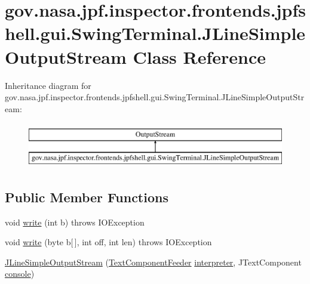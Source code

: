 \hypertarget{classgov_1_1nasa_1_1jpf_1_1inspector_1_1frontends_1_1jpfshell_1_1gui_1_1_swing_terminal_1_1_j_line_simple_output_stream}{}\section{gov.\+nasa.\+jpf.\+inspector.\+frontends.\+jpfshell.\+gui.\+Swing\+Terminal.\+J\+Line\+Simple\+Output\+Stream Class Reference}
\label{classgov_1_1nasa_1_1jpf_1_1inspector_1_1frontends_1_1jpfshell_1_1gui_1_1_swing_terminal_1_1_j_line_simple_output_stream}
Inheritance diagram for gov.\+nasa.\+jpf.\+inspector.\+frontends.\+jpfshell.\+gui.\+Swing\+Terminal.\+J\+Line\+Simple\+Output\+Stream\+:\begin{figure}[H]
\begin{center}
\leavevmode
\includegraphics[height=2.000000cm]{classgov_1_1nasa_1_1jpf_1_1inspector_1_1frontends_1_1jpfshell_1_1gui_1_1_swing_terminal_1_1_j_line_simple_output_stream}
\end{center}
\end{figure}
\subsection*{Public Member Functions}
\begin{DoxyCompactItemize}
\item 
void \hyperlink{classgov_1_1nasa_1_1jpf_1_1inspector_1_1frontends_1_1jpfshell_1_1gui_1_1_swing_terminal_1_1_j_line_simple_output_stream_a9fd173ef490f783345bc182d63f14b71}{write} (int b)  throws I\+O\+Exception 
\item 
void \hyperlink{classgov_1_1nasa_1_1jpf_1_1inspector_1_1frontends_1_1jpfshell_1_1gui_1_1_swing_terminal_1_1_j_line_simple_output_stream_a3dab08ff519f981297b4e585ad743093}{write} (byte b\mbox{[}$\,$\mbox{]}, int off, int len)  throws I\+O\+Exception 
\item 
\hyperlink{classgov_1_1nasa_1_1jpf_1_1inspector_1_1frontends_1_1jpfshell_1_1gui_1_1_swing_terminal_1_1_j_line_simple_output_stream_ab3e2e64960d6bb060e957b096f580c82}{J\+Line\+Simple\+Output\+Stream} (\hyperlink{classgov_1_1nasa_1_1jpf_1_1inspector_1_1frontends_1_1jpfshell_1_1gui_1_1_text_component_feeder}{Text\+Component\+Feeder} \hyperlink{classgov_1_1nasa_1_1jpf_1_1inspector_1_1frontends_1_1jpfshell_1_1gui_1_1_swing_terminal_1_1_j_line_simple_output_stream_a3636ed20e49d89d6ea294e2a6d5fba25}{interpreter}, J\+Text\+Component \hyperlink{classgov_1_1nasa_1_1jpf_1_1inspector_1_1frontends_1_1jpfshell_1_1gui_1_1_swing_terminal_1_1_j_line_simple_output_stream_ac4b63d3fccd27d08c046543b95ff50c1}{console})
\end{DoxyCompactItemize}
